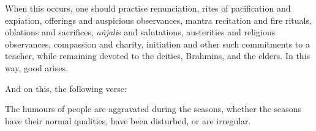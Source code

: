 \begin{translation}
	\item [19]
	When this occurs, %
	one should practise renunciation, %
	rites of pacification and expiation, %
	offerings and auspicious observances, %
	mantra recitation and fire rituals, %
	oblations and sacrifices, %
	\emph{añjali}s and salutations,%
	austerities and religious observances, %
	compassion and charity, %
	initiation and other such commitments to a teacher, %
	while remaining devoted to the deities, Brahmins, and the elders. %
	In this way, good arises. %

	\item [20]
	And on this, the following verse:

	The humours of people are aggravated during the seasons, whether the seasons have their normal qualities, have been disturbed, %
	or are irregular.
\end{translation}